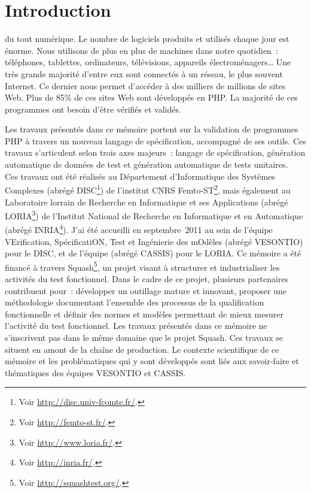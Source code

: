 \chapter{Introduction}
\label{chapter:introduction}

\mminitoc

 du tout numérique. Le nombre de logiciels produits et utilisés
chaque jour est énorme. Nous utilisons de plus en plus de machines dans notre
quotidien~: téléphones, tablettes, ordinateurs, télévisions, appareils
électroménagers… Une très grande majorité d'entre eux sont connectés à un
réseau, le plus souvent Internet. Ce dernier nous permet d'accéder à des
milliers de millions de sites Web. Plus de 85\% de ces sites Web sont développés
en PHP. La majorité de ces programmes ont besoin d'être vérifiés et validés.

Les travaux présentés dans ce mémoire portent sur la validation de programmes
PHP à travers un nouveau langage de spécification, accompagné de ses outils. Ces
travaux s'articulent selon trois axes majeurs~: langage de spécification,
génération automatique de données de test et génération automatique de tests
unitaires. \\

Ces travaux ont été réalisés au Département d'Informatique des Systèmes
Complexes (abrégé DISC\footnote{Voir \url{http://disc.univ-fcomte.fr/}.}) de
l'institut CNRS Femto-ST\footnote{Voir \url{http://femto-st.fr/}.}, mais
également au Laboratoire lorrain de Recherche en Informatique et ses
Applications (abrégé LORIA\footnote{Voir \url{http://www.loria.fr/}.}) de
l'Institut National de Recherche en Informatique et en Automatique (abrégé
INRIA\footnote{Voir \url{http://inria.fr/}.}). J'ai été accueilli en
septembre~2011 au sein de l'équipe VErification, SpécificatiON, Test et
Ingénierie des mOdèles (abrégé VESONTIO) pour le DISC, et de l'équipe
(abrégé CASSIS) pour le LORIA. Ce mémoire a été financé à travers
Squash\footnote{Voir \url{http://squashtest.org/}.}, un projet
 visant à structurer et industrialiser les activités du
test fonctionnel. Dans le cadre de ce projet, plusieurs partenaires contribuent
pour~: développer un outillage  mature et innovant,
proposer une méthodologie  documentant l'ensemble des
processus de la qualification fonctionnelle et définir des normes et modèles
permettant de mieux mesurer l'activité du test fonctionnel. Les travaux
présentés dans ce mémoire ne s'inscrivent pas dans le même domaine que le projet
Squash. Ces travaux se situent en amont de la chaîne de production. Le contexte
scientifique de ce mémoire et les problématiques qui y sont développés sont liés
aux savoir-faire et thématiques des équipes VESONTIO et CASSIS. \\

